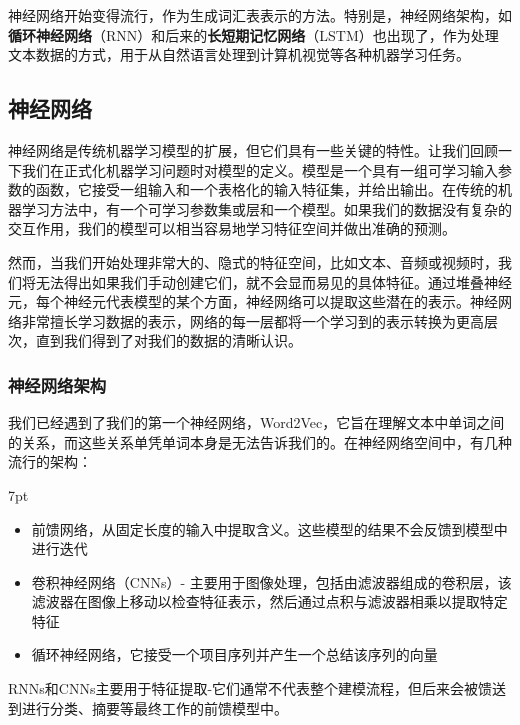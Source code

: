\documentclass[Chinese, 11pt, table]{diazessay} %
\newenvironment{formal}{%
  \def\FrameCommand{%
	\hspace{1pt}%
	{\color{w_lightblue}\vrule width 2pt}%
	{\color{formalshade}\vrule width 4pt}%
	\colorbox{formalshade}%
  }%
  \MakeFramed{\advance\hsize-\width\FrameRestore}%
  \noindent\hspace{-4.55pt}%
  \begin{adjustwidth}{}{7pt}%
  \vspace{2pt}\vspace{2pt}%
}
{%
  \vspace{2pt}\end{adjustwidth}\endMakeFramed%
}
\begin{document}
\begin{CJK}{UTF8}{gbsn}
\begin{sloppypar}
神经网络开始变得流行，作为生成词汇表表示的方法。特别是，神经网络架构，如\textbf{循环神经网络}（RNN）和后来的\textbf{长短期记忆网络}（LSTM）也出现了，作为处理文本数据的方式，用于从自然语言处理到计算机视觉等各种机器学习任务。

\subsection{神经网络}

神经网络是传统机器学习模型的扩展，但它们具有一些关键的特性。让我们回顾一下我们在正式化机器学习问题时对模型的定义。模型是一个具有一组可学习输入参数的函数，它接受一组输入和一个表格化的输入特征集，并给出输出。在传统的机器学习方法中，有一个可学习参数集或层和一个模型。如果我们的数据没有复杂的交互作用，我们的模型可以相当容易地学习特征空间并做出准确的预测。

然而，当我们开始处理非常大的、隐式的特征空间，比如文本、音频或视频时，我们将无法得出如果我们手动创建它们，就不会显而易见的具体特征。通过堆叠神经元，每个神经元代表模型的某个方面，神经网络可以提取这些潜在的表示。神经网络非常擅长学习数据的表示，网络的每一层都将一个学习到的表示转换为更高层次，直到我们得到了对我们的数据的清晰认识\citep{lecun2015deep}。

\subsubsection{神经网络架构}

我们已经遇到了我们的第一个神经网络，Word2Vec，它旨在理解文本中单词之间的关系，而这些关系单凭单词本身是无法告诉我们的。在神经网络空间中，有几种流行的架构：

\begin{formal}
\begin{itemize}
  \item 前馈网络，从固定长度的输入中提取含义。这些模型的结果不会反馈到模型中进行迭代
  \item 卷积神经网络（CNNs）- 主要用于图像处理，包括由滤波器组成的卷积层，该滤波器在图像上移动以检查特征表示，然后通过点积与滤波器相乘以提取特定特征
  \item 循环神经网络，它接受一个项目序列并产生一个总结该序列的向量
\end{itemize}
\end{formal}

RNNs和CNNs主要用于特征提取-它们通常不代表整个建模流程，但后来会被馈送到进行分类、摘要等最终工作的前馈模型中。


\end{sloppypar}
\end{CJK}
\end{document}
